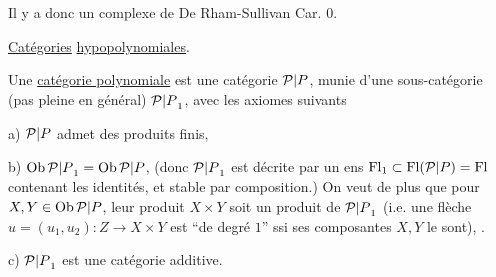 Il y a donc un complexe de De Rham-Sullivan   Car. $0$.

\uline{Catégories} \uline{hypopolynomiales}.

Une \uline{catégorie polynomiale} est une catégorie ${\mathcal P|P}$, munie d'une sous-catégorie (pas pleine en général) ${\mathcal P|P}_1$, avec les axiomes suivants

a) ${\mathcal P|P}$ admet des produits finis, 

b) $\operatorname{Ob}{\mathcal P|P}_1=\operatorname{Ob}{\mathcal P|P}$, 
(donc ${\mathcal P|P}_1$ est décrite par un ens $\operatorname{Fl}_1\subset\operatorname{Fl}({\mathcal P|P})=\operatorname{Fl}$ contenant les identités, et stable par composition.) On veut de plus que  pour $X,Y\in\operatorname{Ob}{\mathcal P|P}$, leur produit $X\times Y$ soit un produit de ${\mathcal P|P}_1$ (i.e. une flèche $u=(u_1,u_2):Z\longrightarrow X\times Y$ est ``de degré $1$'' ssi ses composantes $X,Y$ le sont), .

c) ${\mathcal P|P}_1$ est une catégorie additive.

